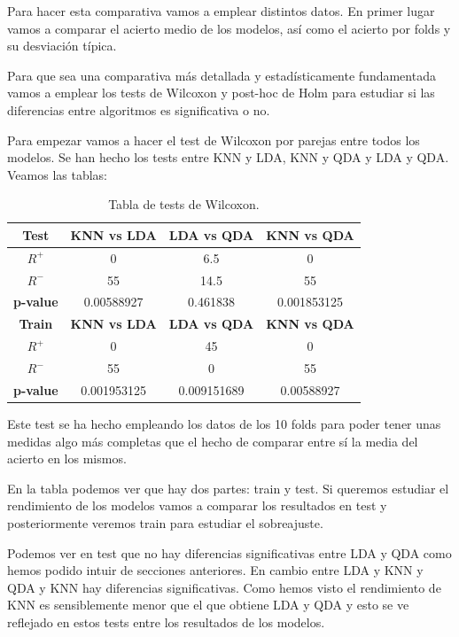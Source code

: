 \documentclass[12pt,a4paper]{article}
\begin{document}
Para hacer esta comparativa vamos a emplear distintos datos. En primer lugar vamos a comparar el acierto medio de los modelos, así como el acierto por folds y su desviación típica.

Para que sea una comparativa más detallada y estadísticamente fundamentada vamos a emplear los tests de Wilcoxon y post-hoc de Holm para estudiar si las diferencias entre algoritmos es significativa o no.

Para empezar vamos a hacer el test de Wilcoxon por parejas entre todos los modelos. Se han hecho los tests entre KNN y LDA, KNN y QDA y LDA y QDA. Veamos las tablas:

\begin{table}[H]
	\centering
	\begin{tabular}{|c|c|c|c|}
		\hline
		\textbf{Test}    & \textbf{KNN vs LDA} & \textbf{LDA vs QDA} & \textbf{KNN vs QDA} \\ \hline
		\textbf{$R^+$}   & 0                   & 6.5                 & 0                   \\ \hline
		\textbf{$R^-$}   & 55                  & 14.5                & 55                  \\ \hline
		\textbf{p-value} & 0.00588927          & 0.461838            & 0.001853125         \\ \hline
		\textbf{Train}   & \textbf{KNN vs LDA} & \textbf{LDA vs QDA} & \textbf{KNN vs QDA} \\ \hline
		\textbf{$R^+$}   & 0                   & 45                  & 0                   \\ \hline
		\textbf{$R^-$}   & 55                  & 0                   & 55                  \\ \hline
		\textbf{p-value} & 0.001953125         & 0.009151689         & 0.00588927          \\ \hline
	\end{tabular}
	\caption{Tabla de tests de Wilcoxon.}
\end{table}

Este test se ha hecho empleando los datos de los 10 folds para poder tener unas medidas algo más completas que el hecho de comparar entre sí la media del acierto en los mismos.

En la tabla podemos ver que hay dos partes: train y test. Si queremos estudiar el rendimiento de los modelos vamos a comparar los resultados en test y posteriormente veremos train para estudiar el sobreajuste.

Podemos ver en test que no hay diferencias significativas entre LDA y QDA como hemos podido intuir de secciones anteriores. En cambio entre LDA y KNN y QDA y KNN hay diferencias significativas. Como hemos visto el rendimiento de KNN es sensiblemente menor que el que obtiene LDA y QDA y esto se ve reflejado en estos tests entre los resultados de los modelos.
\end{document}
